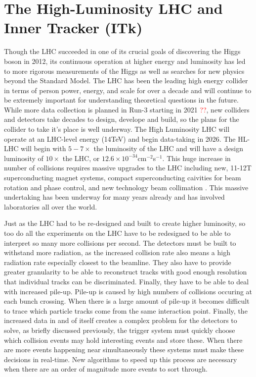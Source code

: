 \section{The High-Luminosity LHC and Inner Tracker (ITk)}
Though the LHC succeeded in one of its crucial goals of discovering the Higgs boson in 2012, its continuous operation at higher energy and luminosity has led to more rigorous measurements of the Higgs as well as searches for new physics beyond the Standard Model. The LHC has been the leading high energy collider in terms of person power, energy, and scale for over a decade and will continue to be extremely important for understanding theoretical questions in the future. While more data collection is planned in Run-3 starting in 2021 \textcolor{red}{??}, new colliders and detectors take decades to design, develope and build, so the plans for the collider to take it's place is well underway. The High Luminosity LHC will operate at an LHC-level energy (14TeV) and begin data-taking in 2026. The HL-LHC will begin with $5-7\times$ the luminosity of the LHC and will have a design luminosity of $10\times$ the LHC, or $12.6\times10^{-34}$cm$^{-2}$s$^{-1}$. This huge increase in number of collisions requires massive upgrades to the LHC including new, 11-12T superconducting magnet systems, compact superconducting caivities for beam rotation and phase control, and new technology beam collimation \cite{HL-LHC Yellow Paper}. This massive undertaking has been underway for many years already and has involved laboratories all over the world.

Just as the LHC had to be re-designed and built to create higher luminosity, so too do all the experiments on the LHC have to be redesigned to be able to interpret so many more collisions per second. The detectors must be built to withstand more radiation, as the increased collision rate also means a high radiation rate especially closest to the beamline. They also have to provide greater granularity to be able to reconstruct tracks with good enough resolution that individual tracks can be discriminated. Finally, they have to be able to deal with increased pile-up. Pile-up is caused by high numbers of collisions occuring at each bunch crossing. When there is a large amount of pile-up it becomes difficult to trace which particle tracks come from the same interaction point. Finally, the increased data in and of itself creates a complex problem for the detectors to solve, as briefly discussed previously, the trigger system must quickly choose which collision events may hold interesting events and store these. When there are more events happening near simultaneously these systems must make these decisions in real-time. New algorithms to speed up this process are necessary when there are an order of magnitude more events to sort through.

